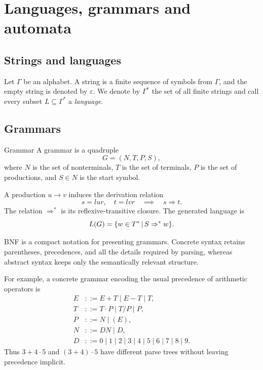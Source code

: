 \documentclass[a4paper]{article}
\newcommand{\eps}{\varepsilon}
\begin{document}
\section{Languages, grammars and automata}

\subsection{Strings and languages}

Let \(\Gamma\) be an alphabet.
A string is a finite sequence of symbols from \(\Gamma\), and the empty string is denoted by \(\eps\).
We denote by \(\Gamma^*\) the set of all finite strings and call every subset \(L\subseteq\Gamma^*\) a \emph{language}.

\subsection{Grammars}

\begin{snippetdefinition}{Grammar}
    A grammar is a quadruple
    \[
        G=(N,T,P,S),
    \]
    where \(N\) is the set of nonterminals, \(T\) is the set of terminals, \(P\) is the set of productions, and \(S\in N\) is the start symbol.
\end{snippetdefinition}

A production \(u\to v\) induces the derivation relation
\[
    s=lur,
    \quad
    t=lvr
    \quad\implies\quad
    s\Rightarrow t.
\]
The relation \(\Rightarrow^*\) is its reflexive-transitive closure.
The generated language is
\[
    L(G)=\{w\in T^*\,|\, S\Rightarrow^* w\}.
\]

BNF is a compact notation for presenting grammars.
Concrete syntax retains parentheses, precedences, and all the details required by parsing, whereas abstract syntax keeps only the semantically relevant structure.

For example, a concrete grammar encoding the usual precedence of arithmetic operators is
\begin{align*}
    E&::=E+T\mid E-T\mid T,\\
    T&::=T\cdot P\mid T/P\mid P,\\
    P&::=N\mid(E),\\
    N&::=DN\mid D,\\
    D&::=0\mid1\mid2\mid3\mid4\mid5\mid6\mid7\mid8\mid9.
\end{align*}
Thus \(3+4\cdot5\) and \((3+4)\cdot5\) have different parse trees without leaving precedence implicit.
\end{document}
